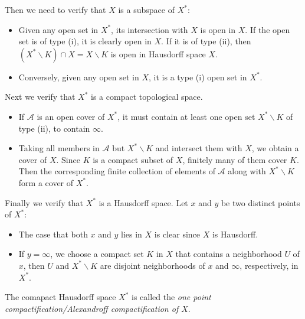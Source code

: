 \documentclass{article}
\numberwithin{equation}{section}
\theoremstyle{plain}
\theoremstyle{definition}
\begin{document}
Then we need to verify that $X$ is a subspace of $X^*$:
\begin{itemize}
	\item Given any open set in $X^*$, its intersection with $X$ is open in $X$. If the open set is of type (i), it is clearly open in $X$. If it is of type (ii), then $(X^*\backslash K)\cap X = X\backslash K$ is open in Hausdorff space $X$.
	\item Conversely, given any open set in $X$, it is a type (i) open set in $X^*$.
\end{itemize}
Next we verify that $X^*$ is a compact topological space. 
\begin{itemize}
	\item If $\mathscr{A}$ is an open cover of $X^*$, it must contain at least one open set $X^*\backslash K$ of type (ii), to contain $\infty$. 
	\item Taking all members in $\mathscr{A}$ but $X^*\backslash K$ and intersect them with $X$, we obtain a cover of $X$. Since $K$ is a compact subset of $X$, finitely many of them cover $K$. Then the corresponding finite collection of elements of $\mathscr{A}$ along with $X^*\backslash K$ form a cover of $X^*$.
\end{itemize}
Finally we verify that $X^*$ is a Hausdorff space. Let $x$ and $y$ be two distinct points of $X^*$:
\begin{itemize}
	\item The case that both $x$ and $y$ lies in $X$ is clear since $X$ is Hausdorff.
	\item If $y=\infty$, we choose a compact set $K$ in $X$ that contains a neighborhood $U$ of $x$, then $U$ and $X^*\backslash K$ are disjoint neighborhoods of $x$ and $\infty$, respectively, in $X^*$.
\end{itemize}
The comapact Hausdorff space $X^*$ is called the \textit{one point compactification/Alexandroff compactification of $X$}.
\end{document}
